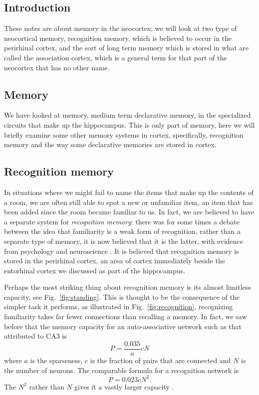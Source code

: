 \documentclass[11pt,a4paper]{scrartcl}
\begin{document}
\subsection*{Introduction}
These notes are about memory in the neocortex; we will look at two
type of neocortical memory, recognition memory, which is believed to
occur in the perirhinal cortex, and the sort of long term memory which
is stored in what are called the association cortex, which is a
general term for that part of the neocortex that has no other name.



\subsection*{Memory}
We have looked at memory, medium term declarative memory, in the
specialized circuits that make up the hippocampus. This is only part
of memory, here we will briefly examine some other memory systems in
cortex, specifically, recognition memory and the way some declarative
memories are stored in cortex.

\subsection*{Recognition memory}

In situations where we might fail to name the items that make up the
contents of a room, we are often still able to spot a new or
unfamiliar item, an item that has been added since the room became
familiar to us. In fact, we are believed to have a separate system for
\textsl{recognition memory}: there was for some times a debate between
the idea that familiarity is a weak form of recognition, rather than a
separate type of memory, it is now believed that it is the latter,
with evidence from psychology \cite{Yonelinas2002a} and neuroscience
\cite{BrownAggleton2001a}. It is believed that recognition memory is
stored in the perirhinal cortex, an area of cortex immediately beside
the entorhinal cortex we discussed as part of the hippocampus.


Perhaps the most striking thing about recognition memory is its almost
limitless capacity, see Fig.~\ref{fig:standing}. This is thought to be
the consequence of the simpler task it performs, as illustrated in
Fig.~\ref{fig:recognition}, recognizing familiarity takes far fewer
connections than recalling a memory. In fact, we saw before that the
memory capacity for an auto-associative network such as that
attributed to CA3 is
\begin{equation}
P=\frac{0.035}{a}cN
\end{equation}
where $a$ is the sparseness, $c$ is the fraction of pairs that are
connected and $N$ is the number of neurons. The comparable formula for
a recognition network is
\begin{equation}
P=0.023cN^2.
\end{equation}
The $N^2$ rather than $N$ gives it a vastly larger capacity \cite{BogaczEtAl2001a}.
\end{document}
